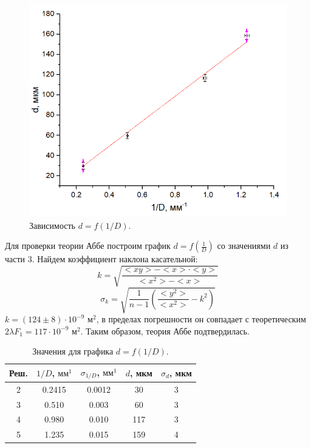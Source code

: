 \documentclass[a4paper,12pt]{report}
\begin{document}
\begin{figure}[h]
\includegraphics[scale=0.7]{2.png}
\centering
\caption{Зависимость $d = f(1/D)$.}
\end{figure}
Для проверки теории Аббе построим график $d = f(\frac{1}{D})$ со значениями $d$ из части 3.
Найдем коэффициент наклона касательной:
\begin{equation*}
    k = \sqrt{\frac{<xy>-<x>\cdot<y>}{<x^2>-<x>}}
\end{equation*}
\begin{equation*}
    \sigma_k = \sqrt{\frac{1}{n-1}(\frac{<y^2>}{<x^2>}-k^2)}
\end{equation*}
$k = (124 \pm 8) \cdot 10^{-9} \text{ м}^2$, в пределах погрешности он совпадает с теоретическим $2\lambda F_1 = 117 \cdot 10^{-9} \text{ м}^2$. Таким образом, теория Аббе подтвердилась.
\begin{table}[h]
\begin{tabular}{|c|c|c|c|c|}
\hline
Реш. & $1/D$, $\text{мм}^1$ & $\sigma_{1/D}$, $\text{мм}^1$ & $d$, мкм & $\sigma_d$, мкм \\ \hline
2    & 0.2415               & 0.0012                        & 30       & 3               \\ \hline
3    & 0.510                & 0.003                         & 60       & 3               \\ \hline
4    & 0.980                & 0.010                         & 117      & 3               \\ \hline
5    & 1.235                & 0.015                         & 159      & 4               \\ \hline
\end{tabular}
\centering
\caption{Значения для графика $d = f(1/D)$.}
\end{table}
\newpage
\end{document}
